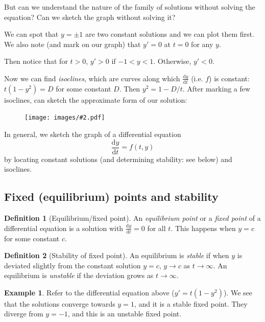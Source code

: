 \documentclass[a4paper]{article}
\theoremstyle{definition}
\newtheorem*{defi}{Definition}
\newtheorem*{eg}{Example}
\renewcommand{\d}{\mathrm{d}}
\newcommand{\img}[2][]{\begin{figure}[ht]\centering\texttt{[image: images/\#2.pdf]}\end{figure}}
\begin{document}
But can we understand the nature of the family of solutions without solving the equation? Can we sketch the graph without solving it?

We can spot that $y = \pm 1$ are two constant solutions and we can plot them first. We also note (and mark on our graph) that $y' = 0$ at $t = 0$ for any $y$.

Then notice that for $t > 0$, $y' > 0$ if $-1 < y < 1$. Otherwise, $y' < 0$.

Now we can find \emph{isoclines}, which are curves along which $\frac{\d y}{\d t}$ (i.e. $f$) is constant: $t(1 - y^2) = D$ for some constant $D$. Then $y^2 = 1 - D/t$. After marking a few isoclines, can sketch the approximate form of our solution:

\img{de_6}

In general, we sketch the graph of a differential equation 
\[
\frac{\d y}{\d t} = f(t, y)
\]
by locating constant solutions (and determining stability: see below) and isoclines.

\subsection{Fixed (equilibrium) points and stability}
\begin{defi}[Equilibrium/fixed point]
  An \emph{equilibrium point} or a \emph{fixed point} of a differential equation is a solution with $\frac{\d y}{\d t} = 0$ for all $t$. This happens when $y = c$ for some constant $c$.
\end{defi}

\begin{defi}[Stability of fixed point]
  An equilibrium is \emph{stable} if when $y$ is deviated slightly from the constant solution $y = c$, $y \to c$ as $t \to \infty$. An equilibrium is \emph{unstable} if the deviation grows as $t \to \infty$.
\end{defi}

\begin{eg}
  Refer to the differential equation above ($y' = t (1 - y^2)$). We see that the solutions converge towards $y = 1$, and it is a stable fixed point. They diverge from $y = -1$, and this is an unstable fixed point.
\end{eg}
\end{document}
